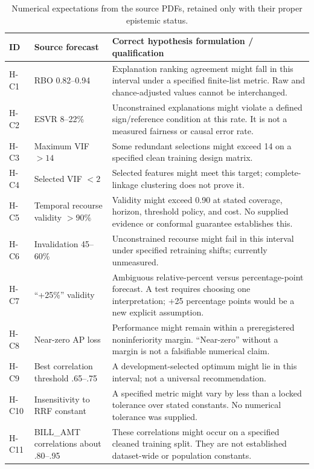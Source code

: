 \documentclass[11pt,a4paper]{article}
\begin{document}
\begin{table}[H]\caption{Numerical expectations from the source PDFs, retained only with their proper epistemic status.}
\small\begin{tabularx}{\linewidth}{p{.10\linewidth}p{.24\linewidth}Y}\toprule
ID & Source forecast & Correct hypothesis formulation / qualification\\\midrule
H-C1 & RBO 0.82--0.94 & Explanation ranking agreement might fall in this interval under a specified finite-list metric. Raw and chance-adjusted values cannot be interchanged.\\
H-C2 & ESVR 8--22\% & Unconstrained explanations might violate a defined sign/reference condition at this rate. It is not a measured fairness or causal error rate.\\
H-C3 & Maximum VIF $>14$ & Some redundant selections might exceed 14 on a specified clean training design matrix.\\
H-C4 & Selected VIF $<2$ & Selected features might meet this target; complete-linkage clustering does not prove it.\\
H-C5 & Temporal recourse validity $>90\%$ & Validity might exceed 0.90 at stated coverage, horizon, threshold policy, and cost. No supplied evidence or conformal guarantee establishes this.\\
H-C6 & Invalidation 45--60\% & Unconstrained recourse might fail in this interval under specified retraining shifts; currently unmeasured.\\
H-C7 & “+25\%” validity & Ambiguous relative-percent versus percentage-point forecast. A test requires choosing one interpretation; +25 percentage points would be a new explicit assumption.\\
H-C8 & Near-zero AP loss & Performance might remain within a preregistered noninferiority margin. “Near-zero” without a margin is not a falsifiable numerical claim.\\
H-C9 & Best correlation threshold .65--.75 & A development-selected optimum might lie in this interval; not a universal recommendation.\\
H-C10 & Insensitivity to RRF constant & A specified metric might vary by less than a locked tolerance over stated constants. No numerical tolerance was supplied.\\
H-C11 & BILL\_AMT correlations about .80--.95 & These correlations might occur on a specified cleaned training split. They are not established dataset-wide or population constants.\\\bottomrule
\end{tabularx}\end{table}
\end{document}
